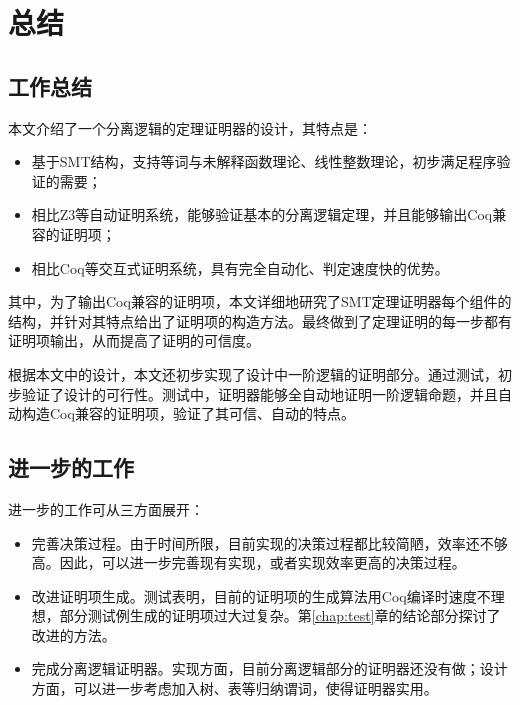 \chapter{总结}
\label{chap:end}

\section{工作总结}
本文介绍了一个分离逻辑的定理证明器的设计，其特点是：
\begin{itemize}
  \item 基于SMT结构，支持等词与未解释函数理论、线性整数理论，初步满足程序验证的需要；
  \item 相比Z3等自动证明系统，能够验证基本的分离逻辑定理，并且能够输出Coq兼容的证明项；
  \item 相比Coq等交互式证明系统，具有完全自动化、判定速度快的优势。
\end{itemize}

其中，为了输出Coq兼容的证明项，本文详细地研究了SMT定理证明器每个组件的结构，并针对其特点给出了证明项的构造方法。最终做到了定理证明的每一步都有证明项输出，从而提高了证明的可信度。

根据本文中的设计，本文还初步实现了设计中一阶逻辑的证明部分。通过测试，初步验证了设计的可行性。测试中，证明器能够全自动地证明一阶逻辑命题，并且自动构造Coq兼容的证明项，验证了其可信、自动的特点。

\section{进一步的工作}
进一步的工作可从三方面展开：
\begin{itemize}
  \item 完善决策过程。由于时间所限，目前实现的决策过程都比较简陋，效率还不够高。因此，可以进一步完善现有实现，或者实现效率更高的决策过程。
  \item 改进证明项生成。测试表明，目前的证明项的生成算法用Coq编译时速度不理想，部分测试例生成的证明项过大过复杂。第\ref{chap:test}章的结论部分探讨了改进的方法。
  \item 完成分离逻辑证明器。实现方面，目前分离逻辑部分的证明器还没有做；设计方面，可以进一步考虑加入树、表等归纳谓词，使得证明器实用。
\end{itemize}



